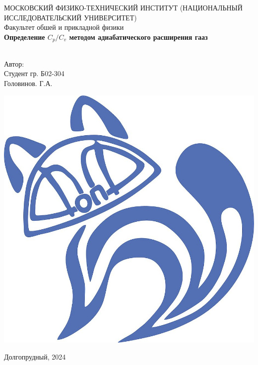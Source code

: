 \begin{titlepage}
	\begin{center}
		МОСКОВСКИЙ ФИЗИКО-ТЕХНИЧЕСКИЙ ИНСТИТУТ (НАЦИОНАЛЬНЫЙ ИССЛЕДОВАТЕЛЬСКИЙ УНИВЕРСИТЕТ) \\
		
		
		\hfill \break
		Факультет обшей и прикладной физики\\
		\vspace{2.5cm}
		\large{\textbf{Определение $C_p/C_v$ методом адиабатического расширения гааз}}\\
		\hfill \break
		\\
	\end{center}
	
	\begin{flushright}
		Автор:\\
		Студент гр. Б02-304\\
		Головинов. Г.А.
	\end{flushright}
	
	\vspace{7cm}
	
	\begin{center}
		\includegraphics[width=0.15\linewidth]{uni}
	\end{center}
	
	
	
	
	\vfill
	
	\begin{center} Долгопрудный, 2024 \end{center}
	
	\thispagestyle{empty}
	
\end{titlepage}